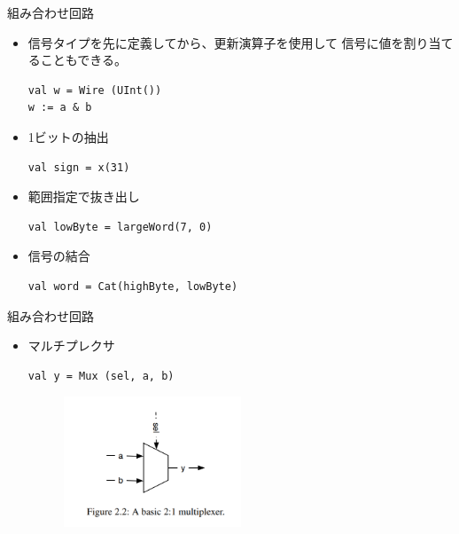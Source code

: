\begin{frame}[fragile]{組み合わせ回路}
    \begin{itemize}
        \item 信号タイプを先に定義してから、更新演算子を使用して
        信号に値を割り当てることもできる。
        \begin{lstlisting}
val w = Wire (UInt())
w := a & b
        \end{lstlisting}
        
        \item 1ビットの抽出
        \begin{lstlisting}
val sign = x(31)
        \end{lstlisting}
        
        \item 範囲指定で抜き出し
        \begin{lstlisting}
val lowByte = largeWord(7, 0)
        \end{lstlisting}
        
        \item 信号の結合
        \begin{lstlisting}
val word = Cat(highByte, lowByte)
        \end{lstlisting}
    \end{itemize}
\end{frame}



\begin{frame}[fragile]{組み合わせ回路}
    \begin{itemize}
        \item マルチプレクサ
        \begin{lstlisting}
val y = Mux (sel, a, b)
        \end{lstlisting}
        \begin{figure}[h]
            \includegraphics[width=0.5\textwidth]{./figures/mux.png}
        \end{figure}
    \end{itemize}
\end{frame}



